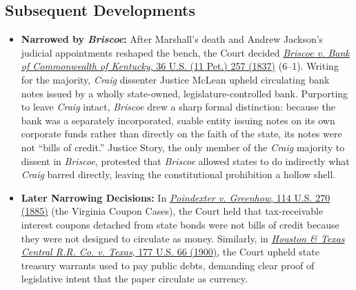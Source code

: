 \documentclass[12pt]{article}
\begin{document}
\subsection{Subsequent Developments}

\begin{itemize}

\item \textbf{Narrowed by \textit{Briscoe}:} After Marshall's death and Andrew Jackson's judicial appointments reshaped the bench, the Court decided \href{https://supreme.justia.com/cases/federal/us/36/257/}{\textit{Briscoe v. Bank of Commonwealth of Kentucky}, 36 U.S. (11 Pet.) 257 (1837)} (6--1). Writing for the majority, \textit{Craig} dissenter Justice McLean upheld circulating bank notes issued by a wholly state-owned, legislature-controlled bank. Purporting to leave \textit{Craig} intact, \textit{Briscoe} drew a sharp formal distinction: because the bank was a separately incorporated, suable entity issuing notes on its own corporate funds rather than directly on the faith of the state, its notes were not ``bills of credit.'' Justice Story, the only member of the \textit{Craig} majority to dissent in \textit{Briscoe}, protested that \textit{Briscoe} allowed states to do indirectly what \textit{Craig} barred directly, leaving the constitutional prohibition a hollow shell.

\item \textbf{Later Narrowing Decisions:} In \href{https://www.law.cornell.edu/supremecourt/text/114/270}{\textit{Poindexter v. Greenhow}, 114 U.S. 270 (1885)} (the Virginia Coupon Cases), the Court held that tax-receivable interest coupons detached from state bonds were not bills of credit because they were not designed to circulate as money. Similarly, in \href{https://www.law.cornell.edu/supremecourt/text/177/66}{\textit{Houston \& Texas Central R.R. Co. v. Texas}, 177 U.S. 66 (1900)}, the Court upheld state treasury warrants used to pay public debts, demanding clear proof of legislative intent that the paper circulate as currency.

\end{itemize}
\end{document}
